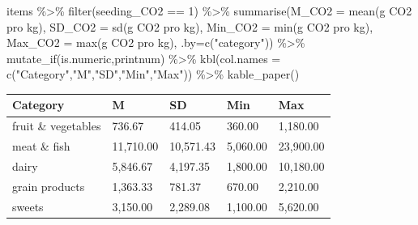 \documentclass[
  letterpaper,
  DIV=11,
  numbers=noendperiod]{scrartcl}
\newenvironment{Shaded}{\begin{snugshade}}{\end{snugshade}}
\newcommand{\AttributeTok}[1]{\textcolor[rgb]{0.40,0.45,0.13}{#1}}
\newcommand{\DecValTok}[1]{\textcolor[rgb]{0.68,0.00,0.00}{#1}}
\newcommand{\FunctionTok}[1]{\textcolor[rgb]{0.28,0.35,0.67}{#1}}
\newcommand{\NormalTok}[1]{\textcolor[rgb]{0.00,0.23,0.31}{#1}}
\newcommand{\SpecialCharTok}[1]{\textcolor[rgb]{0.37,0.37,0.37}{#1}}
\newcommand{\StringTok}[1]{\textcolor[rgb]{0.13,0.47,0.30}{#1}}
\begin{document}
\begin{Shaded}
\begin{Highlighting}[]
\NormalTok{items }\SpecialCharTok{\%\textgreater{}\%}
  \FunctionTok{filter}\NormalTok{(seeding\_CO2 }\SpecialCharTok{==} \DecValTok{1}\NormalTok{) }\SpecialCharTok{\%\textgreater{}\%} 
  \FunctionTok{summarise}\NormalTok{(}\AttributeTok{M\_CO2    =} \FunctionTok{mean}\NormalTok{(}\StringTok{\textasciigrave{}}\AttributeTok{g CO2 pro kg}\StringTok{\textasciigrave{}}\NormalTok{),}
            \AttributeTok{SD\_CO2   =} \FunctionTok{sd}\NormalTok{(}\StringTok{\textasciigrave{}}\AttributeTok{g CO2 pro kg}\StringTok{\textasciigrave{}}\NormalTok{),}
            \AttributeTok{Min\_CO2  =} \FunctionTok{min}\NormalTok{(}\StringTok{\textasciigrave{}}\AttributeTok{g CO2 pro kg}\StringTok{\textasciigrave{}}\NormalTok{),}
            \AttributeTok{Max\_CO2  =} \FunctionTok{max}\NormalTok{(}\StringTok{\textasciigrave{}}\AttributeTok{g CO2 pro kg}\StringTok{\textasciigrave{}}\NormalTok{),}
            \AttributeTok{.by=}\FunctionTok{c}\NormalTok{(}\StringTok{"category"}\NormalTok{)) }\SpecialCharTok{\%\textgreater{}\%} 
  \FunctionTok{mutate\_if}\NormalTok{(is.numeric,printnum) }\SpecialCharTok{\%\textgreater{}\%} 
  \FunctionTok{kbl}\NormalTok{(}\AttributeTok{col.names =} \FunctionTok{c}\NormalTok{(}\StringTok{"Category"}\NormalTok{,}\StringTok{"M"}\NormalTok{,}\StringTok{"SD"}\NormalTok{,}\StringTok{"Min"}\NormalTok{,}\StringTok{"Max"}\NormalTok{))   }\SpecialCharTok{\%\textgreater{}\%} 
  \FunctionTok{kable\_paper}\NormalTok{()}
\end{Highlighting}
\end{Shaded}

\begin{table}
\centering
\begin{tabular}[t]{l|l|l|l|l}
\hline
Category & M & SD & Min & Max\\
\hline
fruit \& vegetables & 736.67 & 414.05 & 360.00 & 1,180.00\\
\hline
meat \& fish & 11,710.00 & 10,571.43 & 5,060.00 & 23,900.00\\
\hline
dairy & 5,846.67 & 4,197.35 & 1,800.00 & 10,180.00\\
\hline
grain products & 1,363.33 & 781.37 & 670.00 & 2,210.00\\
\hline
sweets & 3,150.00 & 2,289.08 & 1,100.00 & 5,620.00\\
\hline
\end{tabular}
\end{table}
\end{document}
